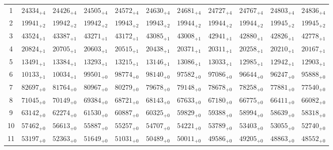 \documentclass[10pt, a4paper]{article}
\begin{document}
\begin{center}
\begin{tabular}{c || c c c c c | c c c c c}
        1 & \({24334}_{+4}\) & \({24426}_{+4}\) & \({24505}_{+4}\) & \({24572}_{+4}\) & \({24630}_{+4}\) & \({24681}_{+4}\) & \({24727}_{+4}\) & \({24767}_{+4}\) & \({24803}_{+4}\) & \({24836}_{+4}\)\\
        2 & \({19941}_{+2}\) & \({19942}_{+2}\) & \({19942}_{+2}\) & \({19943}_{+2}\) & \({19943}_{+2}\) & \({19944}_{+2}\) & \({19944}_{+2}\) & \({19944}_{+2}\) & \({19945}_{+2}\) & \({19945}_{+2}\)\\
        3 & \({43524}_{+1}\) & \({43387}_{+1}\) & \({43271}_{+1}\) & \({43172}_{+1}\) & \({43085}_{+1}\) & \({43008}_{+1}\) & \({42941}_{+1}\) & \({42880}_{+1}\) & \({42826}_{+1}\) & \({42778}_{+1}\)\\
        4 & \({20824}_{+1}\) & \({20705}_{+1}\) & \({20603}_{+1}\) & \({20515}_{+1}\) & \({20438}_{+1}\) & \({20371}_{+1}\) & \({20311}_{+1}\) & \({20258}_{+1}\) & \({20210}_{+1}\) & \({20167}_{+1}\)\\
        5 & \({13491}_{+1}\) & \({13384}_{+1}\) & \({13293}_{+1}\) & \({13215}_{+1}\) & \({13146}_{+1}\) & \({13086}_{+1}\) & \({13033}_{+1}\) & \({12985}_{+1}\) & \({12942}_{+1}\) & \({12903}_{+1}\)\\
        \hline
        6 & \({10133}_{+1}\) & \({10034}_{+1}\) & \({99501}_{+0}\) & \({98774}_{+0}\) & \({98140}_{+0}\) & \({97582}_{+0}\) & \({97086}_{+0}\) & \({96644}_{+0}\) & \({96247}_{+0}\) & \({95888}_{+0}\)\\
        7 & \({82697}_{+0}\) & \({81764}_{+0}\) & \({80967}_{+0}\) & \({80279}_{+0}\) & \({79678}_{+0}\) & \({79148}_{+0}\) & \({78678}_{+0}\) & \({78258}_{+0}\) & \({77881}_{+0}\) & \({77540}_{+0}\)\\
        8 & \({71045}_{+0}\) & \({70149}_{+0}\) & \({69384}_{+0}\) & \({68721}_{+0}\) & \({68143}_{+0}\) & \({67633}_{+0}\) & \({67180}_{+0}\) & \({66775}_{+0}\) & \({66411}_{+0}\) & \({66082}_{+0}\)\\
        9 & \({63142}_{+0}\) & \({62274}_{+0}\) & \({61530}_{+0}\) & \({60887}_{+0}\) & \({60325}_{+0}\) & \({59829}_{+0}\) & \({59388}_{+0}\) & \({58994}_{+0}\) & \({58639}_{+0}\) & \({58318}_{+0}\)\\
        10 & \({57462}_{+0}\) & \({56613}_{+0}\) & \({55887}_{+0}\) & \({55257}_{+0}\) & \({54707}_{+0}\) & \({54221}_{+0}\) & \({53789}_{+0}\) & \({53403}_{+0}\) & \({53055}_{+0}\) & \({52740}_{+0}\)\\
        \hline
        11 & \({53197}_{+0}\) & \({52363}_{+0}\) & \({51649}_{+0}\) & \({51031}_{+0}\) & \({50489}_{+0}\) & \({50011}_{+0}\) & \({49586}_{+0}\) & \({49205}_{+0}\) & \({48863}_{+0}\) & \({48552}_{+0}\)\\

\end{tabular}
\end{center}
\end{document}
